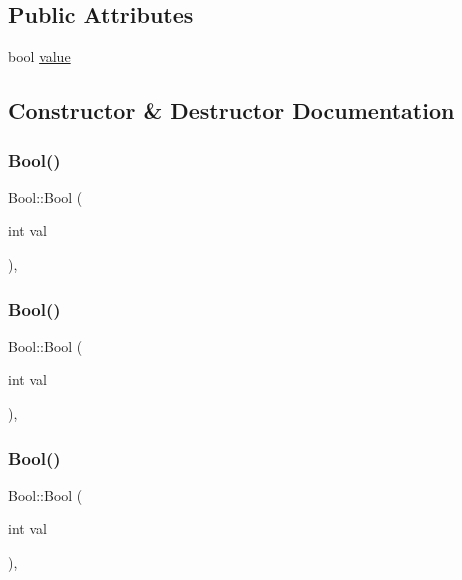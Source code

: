 \subsection*{Public Attributes}
\begin{DoxyCompactItemize}
\item 
bool \mbox{\hyperlink{struct_bool_a16be863c269f988cdcbe59f9d846a141}{value}}
\end{DoxyCompactItemize}


\subsection{Constructor \& Destructor Documentation}
\mbox{\label{struct_bool_a03dfd4851b13abb29414887fcada7fca}} 
\subsubsection{\texorpdfstring{Bool()}{Bool()}\hspace{0.1cm}{\footnotesize\ttfamily [1/3]}}
{\footnotesize\ttfamily Bool\+::\+Bool (\begin{DoxyParamCaption}\item[{int}]{val }\end{DoxyParamCaption})\hspace{0.3cm}{\ttfamily [inline]}, {\ttfamily [explicit]}}

\mbox{\label{struct_bool_a03dfd4851b13abb29414887fcada7fca}} 
\subsubsection{\texorpdfstring{Bool()}{Bool()}\hspace{0.1cm}{\footnotesize\ttfamily [2/3]}}
{\footnotesize\ttfamily Bool\+::\+Bool (\begin{DoxyParamCaption}\item[{int}]{val }\end{DoxyParamCaption})\hspace{0.3cm}{\ttfamily [inline]}, {\ttfamily [explicit]}}

\mbox{\label{struct_bool_a03dfd4851b13abb29414887fcada7fca}} 
\subsubsection{\texorpdfstring{Bool()}{Bool()}\hspace{0.1cm}{\footnotesize\ttfamily [3/3]}}
{\footnotesize\ttfamily Bool\+::\+Bool (\begin{DoxyParamCaption}\item[{int}]{val }\end{DoxyParamCaption})\hspace{0.3cm}{\ttfamily [inline]}, {\ttfamily [explicit]}}



